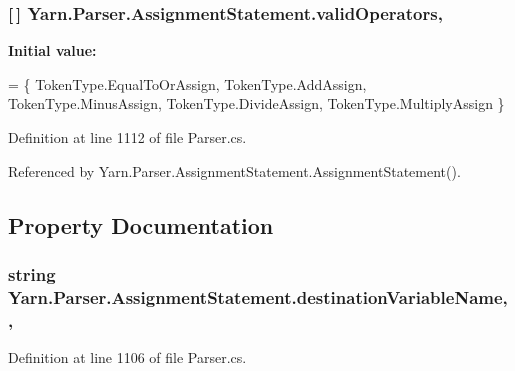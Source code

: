 \hypertarget{a00033_af3d393da2f684272251805d3471b6c7a}{
\subsubsection[{valid\-Operators}]{ \mbox{[}$\,$\mbox{]} Yarn.\-Parser.\-Assignment\-Statement.\-valid\-Operators\hspace{0.3cm}{\ttfamily [static]}, {\ttfamily [private]}}}\label{a00033_af3d393da2f684272251805d3471b6c7a}
{\bfseries Initial value\-:}
\begin{DoxyCode}
= \{
                TokenType.EqualToOrAssign,
                TokenType.AddAssign,
                TokenType.MinusAssign,
                TokenType.DivideAssign,
                TokenType.MultiplyAssign
            \}
\end{DoxyCode}


Definition at line 1112 of file Parser.\-cs.



Referenced by Yarn.\-Parser.\-Assignment\-Statement.\-Assignment\-Statement().



\subsection{Property Documentation}
\hypertarget{a00033_a4e764622b716a4138d1fd9e005c41336}{
\subsubsection[{destination\-Variable\-Name}]{\setlength{\rightskip}{0pt plus 5cm}string Yarn.\-Parser.\-Assignment\-Statement.\-destination\-Variable\-Name\hspace{0.3cm}{\ttfamily [get]}, {\ttfamily [set]}, {\ttfamily [package]}}}\label{a00033_a4e764622b716a4138d1fd9e005c41336}


Definition at line 1106 of file Parser.\-cs.



